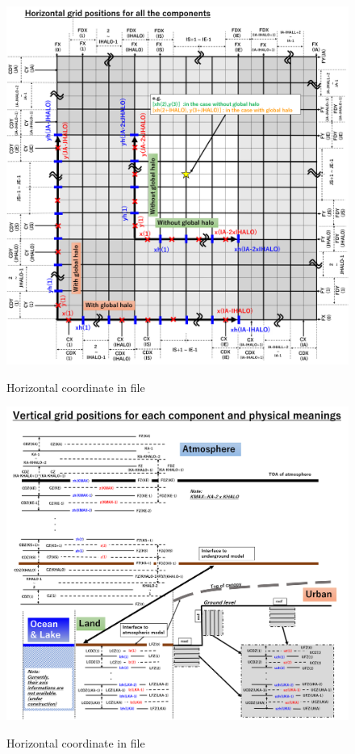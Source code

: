 \begin{figure}[tbh]
\begin{center}
  \includegraphics[width=1.0\hsize]{./figure/horizontal-coordinate-final2.png}\\
  \caption{Horizontal coordinate in \scalenetcdf file}
  \label{fig:netcdfhorizontalcoordinate}
\end{center}
\end{figure}
\begin{figure}[tbh]
\begin{center}
  \includegraphics[width=1.0\hsize]{./figure/vertical_coordinate_final2.png}\\
  \caption{Horizontal coordinate in \scalenetcdf file}
  \label{fig:netcdfverticalcoordinate}
\end{center}
\end{figure}



